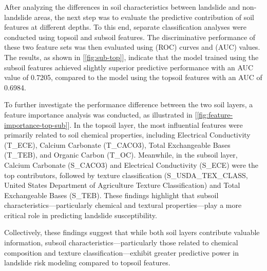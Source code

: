 After analyzing the differences in soil characteristics between landslide and non-landslide areas, the next step was to evaluate the predictive contribution of soil features at different depths. To this end, separate classification analyses were conducted using topsoil and subsoil features. The discriminative performance of these two feature sets was then evaluated using (ROC) curves and (AUC) values. The results, as shown in [\ref{fig:sub-top}], indicate that the model trained using the subsoil features achieved slightly superior predictive performance with an AUC value of 0.7205, compared to the model using the topsoil features with an AUC of 0.6984.

To further investigate the performance difference between the two soil layers, a feature importance analysis was conducted, as illustrated in [\ref{fig:feature-importance-top-sub}]. In the topsoil layer, the most influential features were primarily related to soil chemical properties, including Electrical Conductivity (T\_ECE), Calcium Carbonate (T\_CACO3), Total Exchangeable Bases (T\_TEB), and Organic Carbon (T\_OC). Meanwhile, in the subsoil layer, Calcium Carbonate (S\_CACO3) and Electrical Conductivity (S\_ECE) were the top contributors, followed by texture classification (S\_USDA\_TEX\_CLASS, United States Department of Agriculture Texture Classification) and Total Exchangeable Bases (S\_TEB). These findings highlight that subsoil characteristics—particularly chemical and textural properties—play a more critical role in predicting landslide susceptibility.

Collectively, these findings suggest that while both soil layers contribute valuable information, subsoil characteristics—particularly those related to chemical composition and texture classification—exhibit greater predictive power in landslide risk modeling compared to topsoil features.

